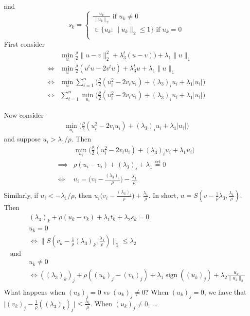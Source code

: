 \documentclass[12pt, leqno]{article}
\providecommand{\abs}[1]{\lvert#1\rvert} %
\providecommand{\norm}[1]{\lVert#1\rVert} %
\DeclareMathOperator*{\sign}{sign}
\begin{document}
and
$$
s_k = \begin{cases} \frac{u_k}{\norm{u_k}_2} \text{ if } u_k \neq 0 \\
\in \{u_k: \norm{u_k}_2 \leq 1\}  \text{ if } u_k = 0 \\
\end{cases}
$$
First consider 
\begin{align*}
 &\min_u \frac{\rho}{2} \norm{u-v}_2^2 + \lambda_3^t(u-v))+ \lambda_1 \norm{u}_1 \\ 
\iff& \min_u \frac{\rho}{2} (u^t u - 2v^t u) + \lambda_3^tu + \lambda_1 \norm{u}_1 \\
\iff& \min_u  \sum_{i = 1}^n \big( \frac{\rho}{2}(u_i^2 - 2 v_i u_i) + (\lambda_3)_i u_i + \lambda_1 \abs{u_i} \big) \\
\iff&  \sum_{i = 1}^n \min_{u_i}  \big( \frac{\rho}{2}(u_i^2 - 2 v_i u_i) + (\lambda_3)_i u_i + \lambda_1 \abs{u_i} \big) 
\end{align*}

Now consider
\begin{align*}
\min_{u_i}  \big( \frac{\rho}{2}(u_i^2 - 2 v_i u_i) + (\lambda_3)_i u_i + \lambda_1 \abs{u_i} \big) 
\end{align*}
and suppose $u_i> \lambda_1/\rho$. Then 
\begin{align*}
&\min_{u_i}  \big( \frac{\rho}{2}(u_i^2 - 2 v_i u_i) + (\lambda_3)_i u_i + \lambda_1 u_i\big) \\
\implies & \rho (u_i-v_i)+ (\lambda_3)_i + \lambda_1 \overset{set}{=} 0 \\
\iff & u_i =  \big( v_i- \frac{(\lambda_3)_i}{\rho} \big)- \frac{\lambda_1}{\rho} \\
\end{align*}
Similarly, if $u_i<-\lambda_1/\rho$, then $u_i \big( v_i- \frac{(\lambda_3)_i}{\rho} \big) + \frac{\lambda_1}{\rho}$. 
In short, $u = S(v - \frac{1}{\rho} \lambda_3, \frac{\lambda_1}{\rho})$.
Then  
\begin{align*}
&(\lambda_3)_k + \rho (u_k-v_k) + \lambda_1 t_k + \lambda_2 s_k = 0 \\
&u_k = 0 \\
&\iff \norm{S(v_k - \frac{1}{\rho} (\lambda_3)_k, \frac{\lambda_1}{\rho})}_2 \leq \lambda_2 \\
\text{ and } \\
&u_k \neq 0 \\
&\iff  ((\lambda_3)_k)_j + \rho ((u_k)_j-(v_k)_j) + \lambda_1 \sign((u_k)_j) + \lambda_2  \frac{u_k}{\norm{u_k}_2}\\
\end{align*}
What happens when $(u_k)_j = 0$ vs $(u_k)_j \neq 0$? When $(u_k)_j = 0$, we have that $\abs{(v_k)_j - \frac{1}{\rho} ((\lambda_3)_k)_j} \leq \frac{\lambda_1}{\rho}$. When $(u_k)_j \neq 0$, ... 
\end{document}
